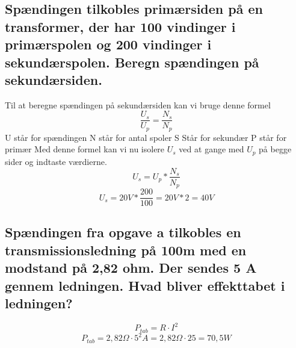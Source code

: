 \subsection{Spændingen tilkobles primærsiden på en transformer, der har 100 vindinger i primærspolen og 200 vindinger i sekundærspolen. Beregn spændingen på sekundærsiden.}
Til at beregne spændingen på sekundærsiden kan vi bruge denne formel
\begin{equation*}
    \frac{U_{s}}{U_{p}}=\frac{N_{s}}{N_{p}}
\end{equation*}
U står for spændingen\newline
N står for antal spoler\newline
S Står for sekundær\newline
P står for primær\newline
Med denne formel kan vi nu isolere \begin{math}U_{s}\end{math} ved at gange med \begin{math}U_{p}\end{math} på begge sider og indtaste værdierne.
\begin{equation*}
    U_{s}=U_{p}*\frac{N_{s}}{N_{p}}
\end{equation*}
\begin{equation*}
    U_{s}=20V*\frac{200}{100}=20V*2=40V
\end{equation*}

\subsection{Spændingen fra opgave a tilkobles en transmissionsledning på 100m med en modstand på 2,82 ohm. Der sendes 5 A gennem ledningen. Hvad bliver effekttabet i ledningen?}
\begin{equation*}
    P_{tab}=R\cdot I^{2}
\end{equation*}
\begin{equation*}
    P_{tab}=2,82\Omega\cdot 5^{2} A=2,82\Omega\cdot 25=70,5W
\end{equation*}

\newpage